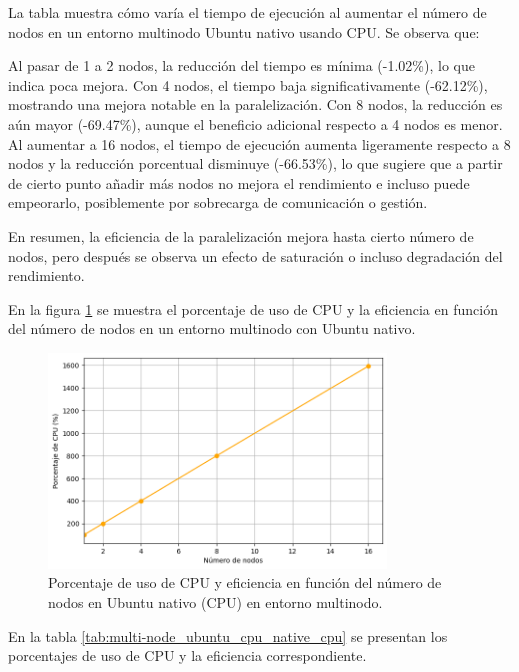 La tabla muestra cómo varía el tiempo de ejecución al aumentar el número de nodos en un entorno multinodo Ubuntu nativo usando CPU. Se observa que:

Al pasar de 1 a 2 nodos, la reducción del tiempo es mínima (-1.02\%), lo que indica poca mejora.
Con 4 nodos, el tiempo baja significativamente (-62.12\%), mostrando una mejora notable en la paralelización.
Con 8 nodos, la reducción es aún mayor (-69.47\%), aunque el beneficio adicional respecto a 4 nodos es menor.
Al aumentar a 16 nodos, el tiempo de ejecución aumenta ligeramente respecto a 8 nodos y la reducción porcentual disminuye (-66.53\%), lo que sugiere que a partir de cierto punto añadir más nodos no mejora el rendimiento e incluso puede empeorarlo, posiblemente por sobrecarga de comunicación o gestión.

En resumen, la eficiencia de la paralelización mejora hasta cierto número de nodos, pero después se observa un efecto de saturación o incluso degradación del rendimiento.

En la figura \ref{fig:multi-node_ubuntu_cpu_native_cpu} se muestra el porcentaje de uso de CPU y la eficiencia en función del número de nodos en un entorno multinodo con Ubuntu nativo.

\begin{figure}[H]
    \centering
    \includegraphics[width=0.8\textwidth]{imagenes/cap5/multi-node_ubuntu_cpu_native_cpu_time.png}
    \caption{Porcentaje de uso de CPU y eficiencia en función del número de nodos en Ubuntu nativo (CPU) en entorno multinodo.}
    \label{fig:multi-node_ubuntu_cpu_native_cpu}
\end{figure}

En la tabla \ref{tab:multi-node_ubuntu_cpu_native_cpu} se presentan los porcentajes de uso de CPU y la eficiencia correspondiente.

